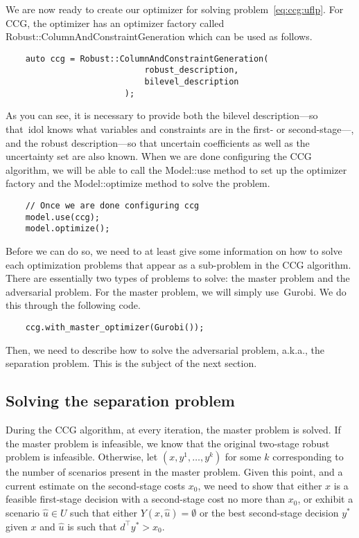 We are now ready to create our optimizer for solving
problem~\eqref{eq:ccg:uflp}. For CCG, the optimizer has an optimizer factory
called \textsf{Robust::ColumnAndConstraintGeneration} which can be used as
follows. 
%
\begin{lstlisting}
    auto ccg = Robust::ColumnAndConstraintGeneration(
                            robust_description,
                            bilevel_description
                        );
\end{lstlisting}
As you can see, it is necessary to provide both the bilevel description---so
that~\textsf{idol} knows what variables and constraints are in the first- or
second-stage---, and the robust description---so that uncertain coefficients
as well as the uncertainty set are also known. When we are done configuring
the CCG algorithm, we will be able to call the \textsf{Model::use} method to
set up the optimizer factory and the \textsf{Model::optimize} method to solve
the problem.
%
\begin{lstlisting}
    // Once we are done configuring ccg
    model.use(ccg);
    model.optimize();
\end{lstlisting}
Before we can do so, we need to at least give some information on how to solve
each optimization problems that appear as a sub-problem in the CCG algorithm.
There are essentially two types of problems to solve: the master problem and
the adversarial problem. For the master problem, we will simply
use~\textsf{Gurobi}. We do this through the following code.
%
\begin{lstlisting}
    ccg.with_master_optimizer(Gurobi());
\end{lstlisting}
Then, we need to describe how to solve the adversarial problem, a.k.a., the
separation problem. This is the subject of the next section.

\subsection{Solving the separation problem}

During the CCG algorithm, at every iteration, the master problem is solved. If
the master problem is infeasible, we know that the original two-stage robust
problem is infeasible. Otherwise, let $(x,y^1,\dotsc,y^k)$ for some $k$
corresponding to the number of scenarios present in the master problem. Given
this point, and a current estimate on the second-stage costs $x_0$, we need to
show that either $x$ is a feasible first-stage decision with a second-stage
cost no more than $x_0$, or exhibit a scenario $\hat{u}\in U$ such that either
$Y(x,\hat{u}) = \emptyset$ or the best second-stage decision $y^*$ given $x$
and $\hat{u}$ is such that $d^\top y^* > x_0$.


